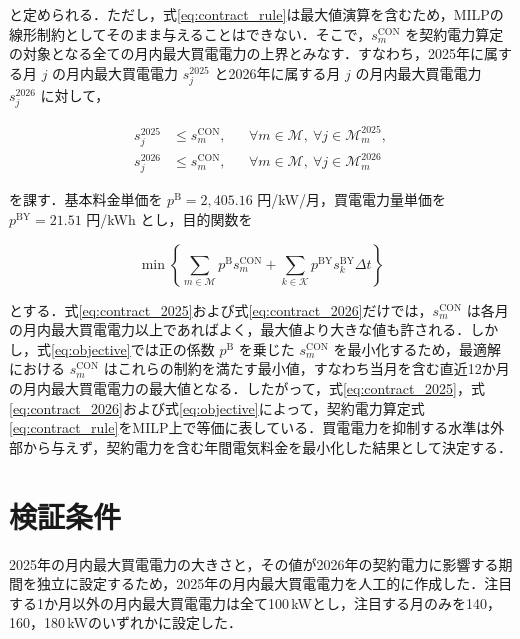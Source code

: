 \documentclass[a4paper,11pt,dvipdfmx]{jsarticle}
\begin{document}
と定められる．ただし，式\eqref{eq:contract_rule}は最大値演算を含むため，MILPの線形制約としてそのまま与えることはできない．そこで，$s_m^{\mathrm{CON}}$ を契約電力算定の対象となる全ての月内最大買電電力の上界とみなす．すなわち，2025年に属する月 $j$ の月内最大買電電力 $s_j^{2025}$ と2026年に属する月 $j$ の月内最大買電電力 $s_j^{2026}$ に対して，

\begin{align}
    s_j^{2025} & \leq s_m^{\mathrm{CON}},
               &                          & \forall m\in\mathcal{M},\ \forall j\in\mathcal{M}_m^{2025}, \label{eq:contract_2025} \\
    s_j^{2026} & \leq s_m^{\mathrm{CON}},
               &                          & \forall m\in\mathcal{M},\ \forall j\in\mathcal{M}_m^{2026} \label{eq:contract_2026}
\end{align}

を課す．基本料金単価を $p^{\mathrm{B}}=2{,}405.16$ 円/kW/月，買電電力量単価を $p^{\mathrm{BY}}=21.51$ 円/kWh とし，目的関数を

\begin{equation}
    \label{eq:objective}
    \min\left\{
    \sum_{m\in\mathcal{M}}p^{\mathrm{B}}s_m^{\mathrm{CON}}
    +
    \sum_{k\in\mathcal{K}}p^{\mathrm{BY}}s_k^{\mathrm{BY}}\Delta t
    \right\}
\end{equation}

とする．式\eqref{eq:contract_2025}および式\eqref{eq:contract_2026}だけでは，$s_m^{\mathrm{CON}}$ は各月の月内最大買電電力以上であればよく，最大値より大きな値も許される．しかし，式\eqref{eq:objective}では正の係数 $p^{\mathrm{B}}$ を乗じた $s_m^{\mathrm{CON}}$ を最小化するため，最適解における $s_m^{\mathrm{CON}}$ はこれらの制約を満たす最小値，すなわち当月を含む直近12か月の月内最大買電電力の最大値となる．したがって，式\eqref{eq:contract_2025}，式\eqref{eq:contract_2026}および式\eqref{eq:objective}によって，契約電力算定式\eqref{eq:contract_rule}をMILP上で等価に表している．買電電力を抑制する水準は外部から与えず，契約電力を含む年間電気料金を最小化した結果として決定する．

\section{検証条件}

2025年の月内最大買電電力の大きさと，その値が2026年の契約電力に影響する期間を独立に設定するため，2025年の月内最大買電電力を人工的に作成した．注目する1か月以外の月内最大買電電力は全て100\,kWとし，注目する月のみを140，160，180\,kWのいずれかに設定した．
\end{document}
